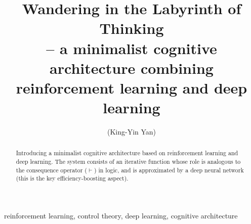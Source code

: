 \documentclass[orivec]{llncs}
\title{Wandering in the Labyrinth of Thinking\\
\normalsize{-- a minimalist cognitive architecture combining\\
reinforcement learning and deep learning}}
\author{\usebox{\MyName} (King-Yin Yan)
}
\institute{General.Intelligence@Gmail.com}
\begin{document}
\maketitle

\setlength{\parindent}{0em}
\setlength{\parskip}{2.8ex plus0.8ex minus0.8ex}

\begin{abstract}
Introducing a minimalist cognitive architecture based on reinforcement learning and deep learning.  The system consists of an iterative function whose role is analogous to the consequence operator ($\vdash$) in logic, and is approximated by a deep neural network (this is the key efficiency-boosting aspect).
\end{abstract}

\begin{keywords}
reinforcement learning, control theory, deep learning, cognitive architecture
\end{keywords}


\end{document}
